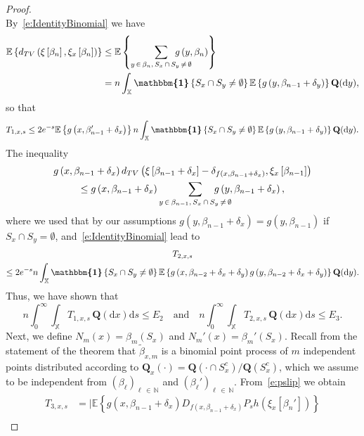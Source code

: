 \documentclass[10pt]{amsart}
\theoremstyle{definition}\newtheorem{defi}[theo]{Definition}\newtheorem{rema}[theo]{Remark}\newtheorem{exam}[theo]{Example}\newtheorem{exem}[theo]{Example}\newtheorem{nota}[theo]{Notation}
\newcommand{\bQ}{\mathbf{Q}}
\newcommand*\N{\mathbb{N}}
\newcommand*\X{\mathbb{X}}
\newcommand{\E}{\mathbb{E}}
\newcommand*\md{\mathrm{d}}
\newcommand{\mean}[1] {\E\left\{{#1}\right\}}
\newcommand{\ind}{\boldsymbol{\mathbbm{1}}}
\begin{document}
\begin{proof}
\[\]
By~\eqref{e:IdentityBinomial} we have
\begin{align*}
\mean{d_{TV}\left(\xi\left[\beta_{n}\right],\xi_x\left[\beta_{n}\right]\right)} & \leq \mean{\sum_{y\,\in\,\beta_{n},\,S_x\,\cap\,S_y\,\neq\,\emptyset}\mkern-35mu g\left(y,\beta_{n}\right) } \\
& = n \int_{\X} \ind\left\{S_x\cap S_y \neq \emptyset\right\} \mean{g\left(y,\beta_{n-1}+\delta_y\right)} \bQ(\md y),
\end{align*}
so that
\[
T_{1,x,s} \leq 2 e^{-s} \mean{g\left(x,\beta_{n-1}'+\delta_x\right)} n \int_{\X} \ind\left\{S_x\cap S_y \neq \emptyset\right\} \mean{g\left(y,\beta_{n-1}+\delta_y\right)} \bQ(\md y).
\]
The inequality
\begin{multline*}
g\left(x,\beta_{n-1}+\delta_x\right) d_{TV}\left(\xi\left[\beta_{n-1}+\delta_x\right] -\delta_{f\left(x,\beta_{n-1}+\delta_x\right)},\xi_x\left[\beta_{n-1}\right]\right) \\
\leq g\left(x,\beta_{n-1}+\delta_x\right) \sum_{y\,\in\,\beta_{n-1},\,S_x\,\cap\,S_y\,\neq\,\emptyset}\mkern-35mu g\left(y,\beta_{n-1}+\delta_x\right),
\end{multline*}
where we used that by our assumptions $g(y,\beta_{n-1}+\delta_x)=g(y,\beta_{n-1})$ if $S_x\cap S_y=\emptyset$, and~\eqref{e:IdentityBinomial} lead to
\begin{multline*}
T_{2,x,s}\\
\leq 2 e^{-s} n \int_{\X} \ind\left\{S_x\cap S_y \neq \emptyset\right\} \mean{g\left(x,\beta_{n-2}+\delta_x+\delta_y\right) g\left(y,\beta_{n-2}+\delta_x+\delta_y\right)} \bQ(\md y).
\end{multline*}
Thus, we have shown that
\begin{equation}\label{e:T1+T2}
n \int_0^\infty \int_{\X} T_{1,x,s} \, \bQ(\md x) \md s \leq E_2 \quad \text{and} \quad n \int_0^\infty \int_{\X} T_{2,x,s} \, \bQ(\md x) \md s \leq E_3.
\end{equation}
Next, we define $N_m(x)=\beta_m(S_x)$ and $N_m'(x)=\beta_m'(S_x)$. Recall from the statement of the theorem that $\widetilde{\beta}_{x,m}$ is a binomial point process of $m$ independent points distributed according to $\bQ_x(\cdot)=\bQ(\cdot \cap S_x^c)/\bQ(S_x^c)$, which we assume to be independent from $(\beta_\ell)_{\ell\,\in\,\N}$ and $(\beta_\ell')_{\ell\,\in\,\N}$. From~\eqref{e:pslip} we obtain
\begin{align*}
T_{3,x,s} & = \big| \mean{g\left(x,\beta_{n-1}+\delta_x\right) D_{f\left(x,\beta_{n-1}+\delta_x\right)}P_sh\left(\xi_x\left[\beta_{n}'\right]\right) } \\

\end{align*}
\end{proof}
\end{document}
